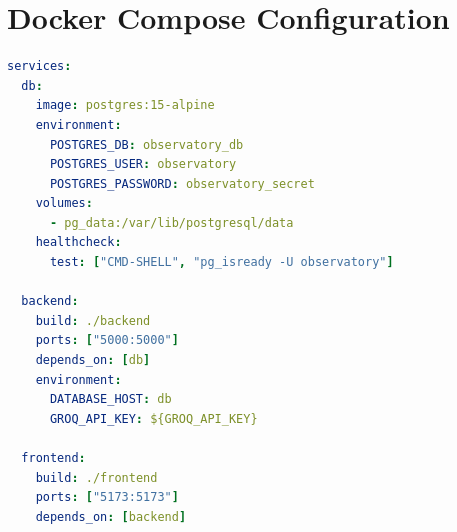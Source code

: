 \documentclass[12pt,a4paper]{report}
\begin{document}
\section*{Docker Compose Configuration}

\begin{lstlisting}[style=custom,language=yaml]
services:
  db:
    image: postgres:15-alpine
    environment:
      POSTGRES_DB: observatory_db
      POSTGRES_USER: observatory
      POSTGRES_PASSWORD: observatory_secret
    volumes:
      - pg_data:/var/lib/postgresql/data
    healthcheck:
      test: ["CMD-SHELL", "pg_isready -U observatory"]

  backend:
    build: ./backend
    ports: ["5000:5000"]
    depends_on: [db]
    environment:
      DATABASE_HOST: db
      GROQ_API_KEY: ${GROQ_API_KEY}

  frontend:
    build: ./frontend
    ports: ["5173:5173"]
    depends_on: [backend]
\end{lstlisting}
\end{document}
